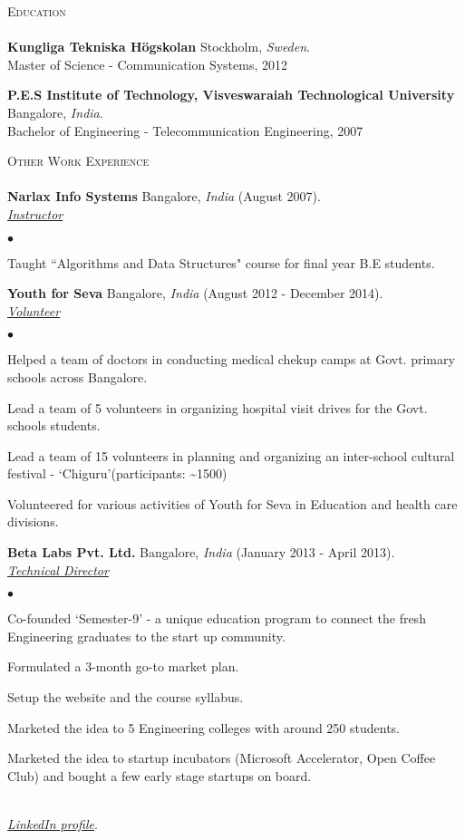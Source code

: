 \documentclass[a4paper]{article}
\newcommand{\lineunder}{\vspace*{-8pt} \\ \hspace*{-18pt} \hrulefill \\}
\newcommand{\header}[1]{{\hspace*{-15pt}\vspace*{6pt} \textsc{#1}} \vspace*{-6pt} \lineunder}
\newcommand{\employer}[4]{{ \textbf{#1} #2  (#3).\\ \underline{\emph{#4}}\\  }}
\newenvironment{achievements}{\begin{list}{$\bullet$}{\topsep 0pt \itemsep -2pt}}{\vspace*{4pt}\end{list}}
\newcommand{\school}[3]{
 \textbf{#1} #2 \\\vspace*{3pt} #3\\
\vspace*{5pt}
}
\begin{document}
\header{Education}

\school{Kungliga Tekniska H\"{o}gskolan}{Stockholm, \textit{Sweden}.}
{Master of Science - Communication Systems, 2012}

\school{P.E.S Institute of Technology, Visveswaraiah Technological University}{Bangalore, \textit{India}.}{Bachelor of Engineering - Telecommunication Engineering, 2007}

\header{Other Work Experience}
\employer{Narlax Info Systems} {Bangalore, \textit{India}}{August 2007}{Instructor}
	\begin{achievements}
	\item Taught ``Algorithms and Data Structures" course for final year B.E students.
	\end{achievements}

\employer{Youth for Seva}{Bangalore, \textit{India}}{August 2012 - December 2014}{Volunteer}
\begin{achievements}
\item Helped a team of doctors in conducting medical chekup camps at Govt. primary schools across Bangalore.
\item Lead a team of 5 volunteers in organizing hospital visit drives for the Govt. schools students.
\item Lead a team of 15 volunteers in planning and organizing an inter-school cultural festival - `Chiguru'(participants: \textasciitilde 1500)
\item Volunteered for various activities of Youth for Seva in Education and health care divisions.
\end{achievements}

\employer{Beta Labs Pvt. Ltd.}{Bangalore, \textit{India}}{January 2013 - April 2013}{Technical Director}
\begin{achievements}
\item Co-founded `Semester-9' - a unique education program to connect the fresh Engineering graduates to the start up community.
\item Formulated a 3-month go-to market plan.
\item Setup the website and the course syllabus.
\item Marketed the idea to 5 Engineering colleges with around 250 students.
\item Marketed the idea to startup incubators (Microsoft Accelerator, Open Coffee Club) and bought a few early stage startups on board.
\end{achievements}

\hspace*{-18pt} \hrulefill \\
\textit{\href{http://se.linkedin.com/in/dandugula}{LinkedIn profile}}.\\
\end{document}
